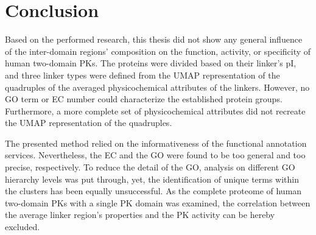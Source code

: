 \chapter{Conclusion}
\label{conclusion}

Based on the performed research, this thesis did not show any general influence of the
inter-domain regions' composition on the function, activity, or specificity of human
two-domain PKs.
The proteins were divided based on their linker's pI, and three linker types were defined
from the UMAP representation of the quadruples of the averaged physicochemical attributes
of the linkers.
However, no GO term or EC number could characterize the established protein groups.
Furthermore, a more complete set of physicochemical attributes did not recreate the UMAP
representation of the quadruples.

The presented method relied on the informativeness of the functional annotation services.
Nevertheless, the EC and the GO were found to be too general and too precise,
respectively.
To reduce the detail of the GO, analysis on different GO hierarchy levels was put through,
yet, the identification of unique terms within the clusters has been equally unsuccessful.
As the complete proteome of human two-domain PKs with a single PK domain was examined,
the correlation between the average linker region's properties and the PK activity can be
hereby excluded.


%

